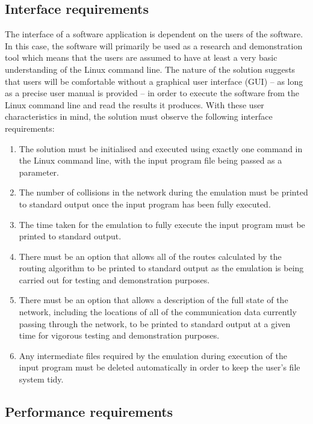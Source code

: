 \documentclass[a4paper, 12pt]{article}
\begin{document}
\subsection{Interface requirements}
\label{sec:req_int}

The interface of a software application is dependent on the users of the software. In this case, the software will primarily be used as a research and demonstration tool which means that the users are assumed to have at least a very basic understanding of the Linux command line. The nature of the solution suggests that users will be comfortable without a graphical user interface (GUI) -- as long as a precise user manual is provided -- in order to execute the software from the Linux command line and read the results it produces. With these user characteristics in mind, the solution must observe the following interface requirements:
\begin{enumerate}[leftmargin=*,labelindent=15pt,label=\bfseries 2.\arabic*] 
	\item The solution must be initialised and executed using exactly one command in the Linux command line, with the input program file being passed as a parameter. 
	\item The number of collisions in the network during the emulation must be printed to standard output once the input program has been fully executed.
	\item The time taken for the emulation to fully execute the input program must be printed to standard output.
	\item There must be an option that allows all of the routes calculated by the routing algorithm to be printed to standard output as the emulation is being carried out for testing and demonstration purposes.
	\item There must be an option that allows a description of the full state of the network, including the locations of all of the communication data currently passing through the network, to be printed to standard output at a given time for vigorous testing and demonstration purposes.
	\item Any intermediate files required by the emulation during execution of the input program must be deleted automatically in order to keep the user's file system tidy.
\end{enumerate}

\subsection{Performance requirements}
\label{sec:req_per}
\end{document}
